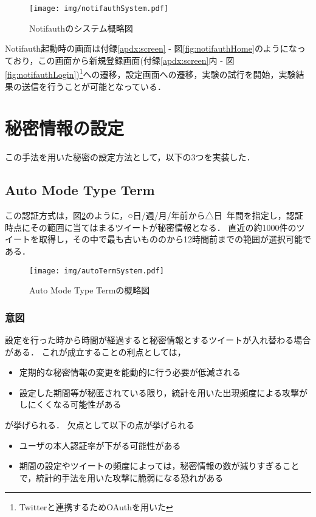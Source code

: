 \begin{figure}[ht]
  \begin{center}
    \texttt{[image: img/notifauthSystem.pdf]}
  \end{center}
  \caption{Notifauthのシステム概略図}
  \label{fig:notifauthSystem}
\end{figure}

Notifauth起動時の画面は付録\ref{apdx:screen} - 図\ref{fig:notifauthHome}のようになっており，この画面から新規登録画面(付録\ref{apdx:screen}内 - 図\ref{fig:notifauthLogin})\footnote{Twitterと連携するためOAuthを用いた}への遷移，設定画面への遷移，実験の試行を開始，実験結果の送信を行うことが可能となっている．

\section{秘密情報の設定}\label{sec:selectSecret}
この手法を用いた秘密の設定方法として，以下の3つを実装した．

\subsection{Auto Mode Type Term}
この認証方式は，図\ref{fig:autoTermSystem}のように，○日/週/月/年前から△日~年間を指定し，認証時点にその範囲に当てはまるツイートが秘密情報となる．
直近の約1000件のツイートを取得し，その中で最も古いもののから12時間前までの範囲が選択可能である．

\begin{figure}[ht]
  \begin{center}
    \texttt{[image: img/autoTermSystem.pdf]}
  \end{center}
  \caption{Auto Mode Type Termの概略図}
  \label{fig:autoTermSystem}
\end{figure}

\subsubsection{意図}
設定を行った時から時間が経過すると秘密情報とするツイートが入れ替わる場合がある．
これが成立することの利点としては，
\begin{itemize}
  \item 定期的な秘密情報の変更を能動的に行う必要が低減される
  \item 設定した期間等が秘匿されている限り，統計を用いた出現頻度による攻撃がしにくくなる可能性がある
\end{itemize}
が挙げられる．
欠点として以下の点が挙げられる
\begin{itemize}
  \item ユーザの本人認証率が下がる可能性がある
  \item 期間の設定やツイートの頻度によっては，秘密情報の数が減りすぎることで，統計的手法を用いた攻撃に脆弱になる恐れがある
\end{itemize}

